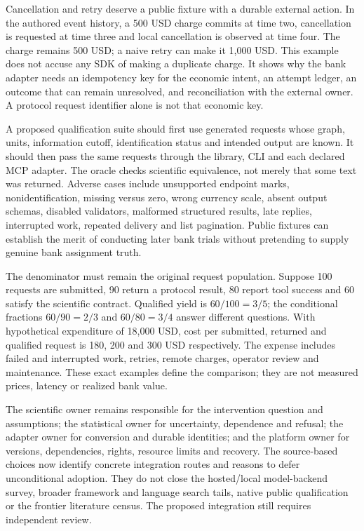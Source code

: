 Cancellation and retry deserve a public fixture with a durable external
action. In the authored event history, a 500 USD charge commits at time two,
cancellation is requested at time three and local cancellation is observed
at time four. The charge remains 500 USD; a naive retry can make it 1,000 USD.
This example does not accuse any SDK of making a duplicate charge. It shows
why the bank adapter needs an idempotency key for the economic intent, an
attempt ledger, an outcome that can remain unresolved, and reconciliation
with the external owner. A protocol request identifier alone is not that
economic key.~\citep{exec24_mcp_contracts}

A proposed qualification suite should first use generated requests whose
graph, units, information cutoff, identification status and intended output
are known. It should then pass the same requests through the library, CLI
and each declared MCP adapter. The oracle checks scientific equivalence,
not merely that some text was returned. Adverse cases include unsupported
endpoint marks, nonidentification, missing versus zero, wrong currency scale,
absent output schemas, disabled validators, malformed structured results,
late replies, interrupted work, repeated delivery and list pagination.
Public fixtures can establish the merit of conducting later bank trials
without pretending to supply genuine bank assignment truth.
\citep{exec24_mcp_contracts}

The denominator must remain the original request population. Suppose 100
requests are submitted, 90 return a protocol result, 80 report tool success
and 60 satisfy the scientific contract. Qualified yield is $60/100=3/5$;
the conditional fractions $60/90=2/3$ and $60/80=3/4$ answer different
questions. With hypothetical expenditure of 18,000 USD, cost per submitted,
returned and qualified request is 180, 200 and 300 USD respectively. The
expense includes failed and interrupted work, retries, remote charges,
operator review and maintenance. These exact examples define the comparison;
they are not measured prices, latency or realized bank value.
\citep{exec24_mcp_contracts}

The scientific owner remains responsible for the intervention question and
assumptions; the statistical owner for uncertainty, dependence and refusal;
the adapter owner for conversion and durable identities; and the platform
owner for versions, dependencies, rights, resource limits and recovery.
The source-based choices now identify concrete integration routes and
reasons to defer unconditional adoption. They do not close the hosted/local
model-backend survey, broader framework and language search tails, native
public qualification or the frontier literature census. The proposed integration still requires independent review.
\citep{exec24_mcp_contracts}

